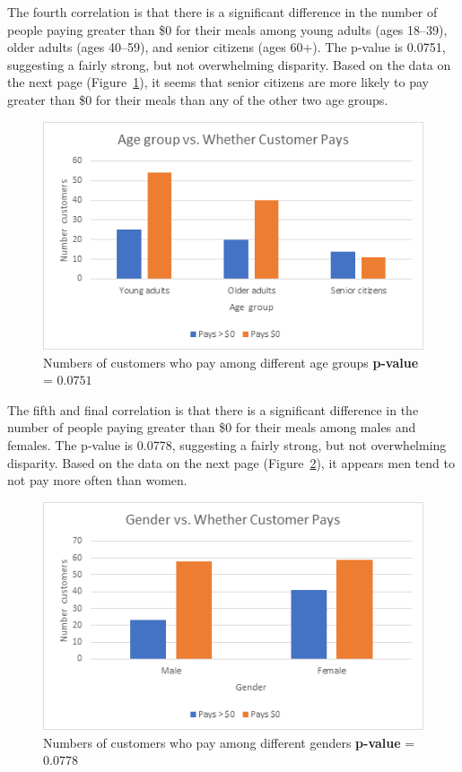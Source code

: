 The fourth correlation is that there is a significant difference in the number of people paying greater than \$0 for their meals among young adults (ages 18--39), older adults (ages 40--59), and senior citizens (ages 60+). The p-value is 0.0751, suggesting a fairly strong, but not overwhelming disparity. Based on the data on the next page (Figure~\ref{fig:age-v-pay}), it seems that senior citizens are more likely to pay greater than \$0 for their meals than any of the other two age groups.

\begin{figure}[H]
    \centering \includegraphics*[scale=.5]{assets/age-v-pay.png}
    
    \caption{Numbers of customers who pay among different age groups
    \textbf{p-value} = \(0.0751\)}\label{fig:age-v-pay}
\end{figure}

The fifth and final correlation is that there is a significant difference in the number of people paying greater than \$0 for their meals among males and females. The p-value is 0.0778, suggesting a fairly strong, but not overwhelming disparity. Based on the data on the next page (Figure~\ref{fig:gender-v-pay}), it appears men tend to not pay more often than women.

\begin{figure}[H]
    \centering \includegraphics*[scale=.5]{assets/gender-v-pay.png}
    
    \caption{Numbers of customers who pay among different genders
    \textbf{p-value} = \(0.0778\)}\label{fig:gender-v-pay}
\end{figure}

